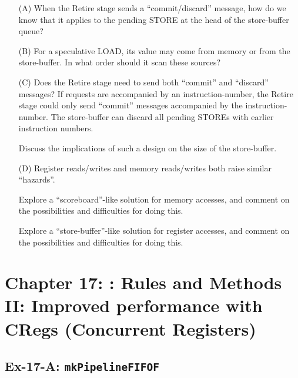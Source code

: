 \begin{itemize}

 \item[(A)] When the Retire stage sends a ``commit/discard'' message, how
       do we know that it applies to the pending STORE at the head of
       the store-buffer queue?

 \item[(B)] For a speculative LOAD, its value may come from memory or from
       the store-buffer.  In what order should it scan these sources?

 \item[(C)] Does the Retire stage need to send both ``commit'' and
       ``discard'' messages?  If requests are accompanied by an
       instruction-number, the Retire stage could only send ``commit''
       messages accompanied by the instruction-number.  The
       store-buffer can discard all pending STOREs with earlier
       instruction numbers.

       Discuss the implications of such a design on the size of the
       store-buffer.

 \item[(D)] Register reads/writes and memory reads/writes both raise
       similar ``hazards''.

       Explore a ``scoreboard''-like solution for memory accesses, and
       comment on the possibilities and difficulties for doing this.

       Explore a ``store-buffer''-like solution for register accesses,
       and comment on the possibilities and difficulties for doing
       this.

\end{itemize}


\hdivider

\section*{Chapter 17: {\BSV}: Rules and Methods II: Improved performance with CRegs (Concurrent Registers)}


\subsection*{Ex-17-A: {\tt mkPipelineFIFOF}}
\label{Ex-17-A-PipelineFIFOs}

